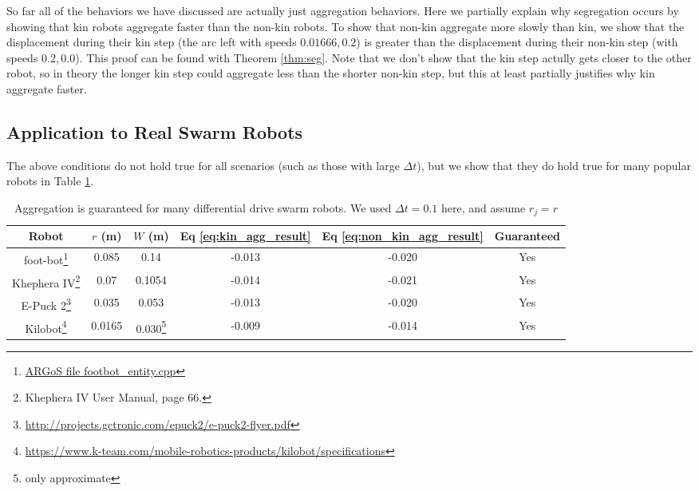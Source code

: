 \documentclass[conference]{IEEEtran}
\begin{document}
    So far all of the behaviors we have discussed are actually just aggregation behaviors. Here we partially explain why segregation occurs by showing that kin robots aggregate faster than the non-kin robots. To show that non-kin aggregate more slowly than kin, we show that the displacement during their kin step (the arc left with speeds $0.01666, 0.2$) is greater than the displacement during their non-kin step (with speeds $0.2, 0.0$). This proof can be found with Theorem \ref{thm:seg}. Note that we don't show that the kin step actully gets closer to the other robot, so in theory the longer kin step could aggregate less than the shorter non-kin step, but this at least partially justifies why kin aggregate faster.

  \subsection{Application to Real Swarm Robots}

    The above conditions do not hold true for all scenarios (such as those with large $\Delta t$), but we show that they do hold true for many popular robots in Table \ref{table:robots}.

    \begin{savenotes}
    \begin{table}
      \centering
      \caption{Aggregation is guaranteed for many differential drive swarm robots. We used $\Delta t=0.1$ here, and assume $r_j=r$}
      \begin{tabular}{|c|c|c|c|c|c|} \hline
        Robot & $r$ (m) & $W$ (m) & Eq \eqref{eq:kin_agg_result}& Eq \eqref{eq:non_kin_agg_result} & Guaranteed \\ \hline
        foot-bot\footnote{\href{https://github.com/ilpincy/argos3/blob/master/src/plugins/robots/foot-bot/simulator/footbot_entity.cpp}{ARGoS file footbot\_entity.cpp}} &
            0.085 & 0.14 & -0.013 & -0.020 & Yes \\ \hline
        Khephera IV\footnote{Khephera IV User Manual, page 66.} &
            0.07 & 0.1054 & -0.014 & -0.021 & Yes \\ \hline
        E-Puck 2\footnote{\href{http://projects.gctronic.com/epuck2/e-puck2-flyer.pdf}{http://projects.gctronic.com/epuck2/e-puck2-flyer.pdf}} &
            0.035 & 0.053 & -0.013 & -0.020 & Yes \\ \hline
        Kilobot\footnote{\href{https://www.k-team.com/mobile-robotics-products/kilobot/specifications}{https://www.k-team.com/mobile-robotics-products/kilobot/specifications}} &
            0.0165 & 0.030\footnote{only approximate} & -0.009 & -0.014 & Yes \\ \hline
      \end{tabular}
      \label{table:robots}
    \end{table}
    \end{savenotes}
\end{document}
